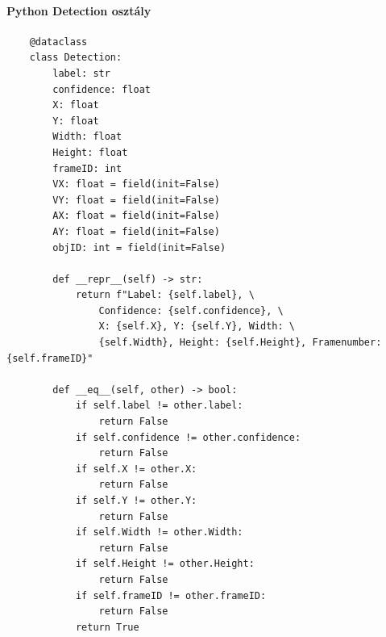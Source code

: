 \documentclass[12pt,a4paper]{article}
\begin{document}
\paragraph{Python Detection osztály} 
\begin{verbatim}
    @dataclass
    class Detection:
        label: str
        confidence: float
        X: float
        Y: float
        Width: float
        Height: float
        frameID: int
        VX: float = field(init=False)
        VY: float = field(init=False)
        AX: float = field(init=False)
        AY: float = field(init=False)
        objID: int = field(init=False)

        def __repr__(self) -> str:
            return f"Label: {self.label}, \
                Confidence: {self.confidence}, \
                X: {self.X}, Y: {self.Y}, Width: \
                {self.Width}, Height: {self.Height}, Framenumber: {self.frameID}"

        def __eq__(self, other) -> bool:
            if self.label != other.label:
                return False
            if self.confidence != other.confidence:
                return False
            if self.X != other.X:
                return False
            if self.Y != other.Y:
                return False
            if self.Width != other.Width:
                return False
            if self.Height != other.Height:
                return False
            if self.frameID != other.frameID:
                return False
            return True
\end{verbatim}
\end{document}
